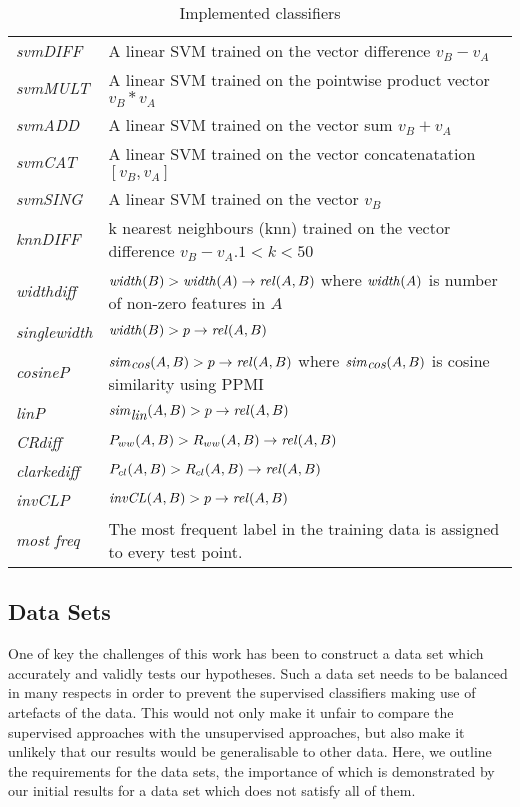 \documentclass[11pt]{article}
\newcommand\invCL[1]{\mbox{\em invCL\/}(#1)}
\newcommand\simcos[1]{\mbox{\em sim\/}_{\mbox{\em cos}}(#1)}
\newcommand\simlin[1]{\mbox{\em sim\/}_{\mbox{\em lin}}(#1)}
\newcommand\width[1]{\mbox{\em width\/}(#1)}
\newcommand\rel[1]{\mbox{\em rel\/}(#1)}
\begin{document}
\begin{table*}[ht]
\centering
\begin{tabular}{|l|p{14cm}|}
\hline
\emph{svmDIFF}& A linear SVM trained on the vector difference $v_B - v_A$\\
\emph{svmMULT}& A linear SVM trained on the pointwise product vector $v_B * v_A$\\
\emph{svmADD}& A linear SVM trained on the vector sum $v_B + v_A$\\
\emph{svmCAT}& A linear SVM trained on the vector concatenatation $[v_B,v_A]$\\
\emph{svmSING}& A linear SVM trained on the vector $v_B$\\
\emph{knnDIFF}& k nearest neighbours (knn) trained on the vector difference $v_B - v_A$.$1< k<50$\\
\hline
\emph{widthdiff}& $\width{B} > \width{A} \rightarrow\rel{A,B}$  where $\width{A}$ is  number of non-zero features in $A$\\
\emph{singlewidth}& $\width{B} > p \rightarrow \rel{A,B}$\\
\emph{cosineP}& $\simcos{A,B} > p \rightarrow\rel{A,B}$ where $\simcos{A,B}$ is cosine similarity using PPMI\\
\emph{linP}&$\simlin{A,B} > p \rightarrow\rel{A,B}$ \cite{Lin1998}\\
\emph{CRdiff}& $P_{ww}(A,B) > R_{ww}(A,B) \rightarrow\rel{A,B}$  \cite{Weeds2004}\\
\emph{clarkediff}&$P_{cl}(A,B) > R_{cl}(A,B) \rightarrow\rel{A,B}$  \cite{Clarke:09}\\
\emph{invCLP}&$\invCL{A,B} > p \rightarrow\rel{A,B}$  \cite{Lenci2012}\\
\emph{most freq}&The most frequent label in the training data is assigned to every test point.\\
\hline
\end{tabular}
\caption{Implemented classifiers}
\label{table:classifiers}
\end{table*}


\subsection{Data Sets}
\label{sect:data}

One of key the challenges of this work has been to construct a data set which accurately and validly tests our hypotheses.  Such a data set needs to be balanced in many respects in order to prevent the supervised classifiers making use of artefacts of the data.  This would not only make it unfair to compare the supervised approaches with the unsupervised approaches, but also make it unlikely that our results would be generalisable to other data.  Here, we outline the requirements for the data sets, the importance of which is demonstrated by our initial results for a data set which does not satisfy all of them.
\end{document}
